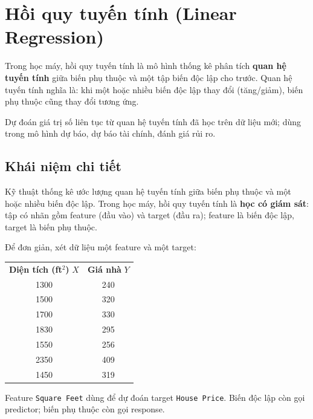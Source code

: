 \section{Hồi quy tuyến tính (Linear Regression)}
\label{sec:linear-regression}

\begin{dinhnghia}[title={Hồi quy tuyến tính}]
Trong học máy, hồi quy tuyến tính là mô hình thống kê phân tích \textbf{quan hệ tuyến tính} giữa biến phụ thuộc và một tập biến độc lập cho trước.
Quan hệ tuyến tính nghĩa là: khi một hoặc nhiều biến độc lập thay đổi (tăng/giảm), biến phụ thuộc cũng thay đổi tương ứng.
\end{dinhnghia}

\begin{ynghia}[title={Ứng dụng trong học máy}]
Dự đoán giá trị số liên tục từ quan hệ tuyến tính đã học trên dữ liệu mới; dùng trong mô hình dự báo, dự báo tài chính, đánh giá rủi ro.
\end{ynghia}

\subsection{Khái niệm chi tiết}

\begin{dinhnghia}[title={Hồi quy tuyến tính (định nghĩa mở rộng)}]
Kỹ thuật thống kê ước lượng quan hệ tuyến tính giữa biến phụ thuộc và một hoặc nhiều biến độc lập.
Trong học máy, hồi quy tuyến tính là \textbf{học có giám sát}: tập có nhãn gồm feature (đầu vào) và target (đầu ra); feature là biến độc lập, target là biến phụ thuộc.
\end{dinhnghia}

\begin{phuongphap}[title={Ví dụ một feature --- diện tích và giá nhà}]
Để đơn giản, xét dữ liệu một feature và một target:
\begin{center}
\small
\begin{tabular}{cc}
\textbf{Diện tích (ft$^2$)} $X$ & \textbf{Giá nhà} $Y$ \\
1300 & 240 \\
1500 & 320 \\
1700 & 330 \\
1830 & 295 \\
1550 & 256 \\
2350 & 409 \\
1450 & 319 \\
\end{tabular}
\end{center}
Feature \texttt{Square Feet} dùng để dự đoán target \texttt{House Price}.
Biến độc lập còn gọi predictor; biến phụ thuộc còn gọi response.
\end{phuongphap}


